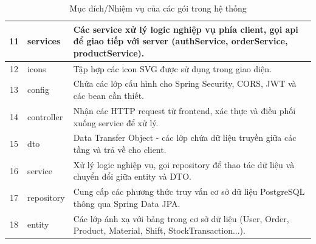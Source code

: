 \documentclass[../20232006p.tex]{subfiles}
\begin{document}
\begin{table}[H]
\begin{tabular}{|c|p{2.5cm}|p{8.5cm}|}
        11           & services         & Các service xử lý logic nghiệp vụ phía client, gọi api để giao tiếp với server (authService, orderService, productService).         \\ \hline
        12           & icons            & Tập hợp các icon SVG được sử dụng trong giao diện.                                                                                  \\ \hline
        13           & config           & Chứa các lớp cấu hình cho Spring Security, CORS, JWT và các bean cần thiết.                                                         \\ \hline
        14           & controller       & Nhận các HTTP request từ frontend, xác thực và điều phối xuống service để xử lý.                                                    \\ \hline
        15           & dto              & Data Transfer Object - các lớp chứa dữ liệu truyền giữa các tầng và trả về cho client.                                              \\ \hline
        16           & service          & Xử lý logic nghiệp vụ, gọi repository để thao tác dữ liệu và chuyển đổi giữa entity và DTO.                                         \\ \hline
        17           & repository       & Cung cấp các phương thức truy vấn cơ sở dữ liệu PostgreSQL thông qua Spring Data JPA.                                               \\ \hline
        18           & entity           & Các lớp ánh xạ với bảng trong cơ sở dữ liệu (User, Order, Product, Material, Shift, StockTransaction...).                           \\ \hline
    \end{tabular}
    \caption{Mục đích/Nhiệm vụ của các gói trong hệ thống}
\end{table}


\end{document}
